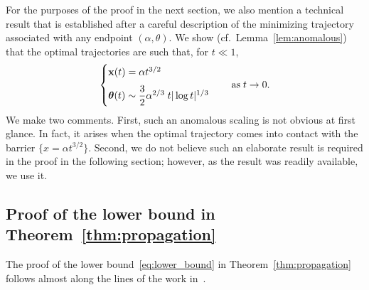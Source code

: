 \documentclass[10pt]{amsart}
\theoremstyle{definition}\newtheorem{defi}[theo]{Definition}\newtheorem{rema}[theo]{Remark}\newtheorem{exam}[theo]{Example}\newtheorem{exem}[theo]{Example}\newtheorem{nota}[theo]{Notation}
\newcommand{\bx}{\mathbf{x}}
\newcommand{\btheta}{\boldsymbol{\theta}}
\newcommand{\1}{\mathds{1}}
\begin{document}
For the purposes of the proof in the next section, we also mention a technical result that is established after a careful description of the minimizing trajectory associated with any endpoint $(\alpha,\theta)$. We show (cf.~Lemma~\ref{lem:anomalous}) that the optimal trajectories are such that, for $t \ll 1$,
\begin{equation}\label{eq:theta scaling sec 3}
\begin{cases}
\bx(t) = \alpha t^{3/2}
\medskip
\\
\btheta(t)\sim \dfrac32 \alpha^{2/3}\; t |\log t|^{1/3}
\end{cases}
\quad \text{as}\; t\to 0.
\end{equation}
We make two comments. First, such an anomalous scaling is not obvious at first glance. In fact, it arises when the optimal trajectory comes into contact with the barrier $\{x = \alpha t^{3/2}\}$. Second, we do not believe such an elaborate result is required in the proof in the following section; however, as the result was readily available, we use it.
\vspace{15pt}

\pagebreak

\subsection{Proof of the lower bound in Theorem~\ref{thm:propagation}}


The proof of the lower bound~\eqref{eq:lower_bound} in Theorem~\ref{thm:propagation} follows almost along the lines of the work in~\cite{BHR_acceleration}.
\end{document}
